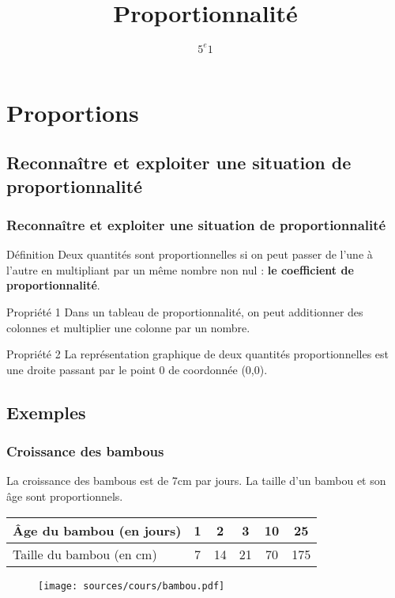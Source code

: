 \documentclass{beamer}
\title{Proportionnalité}
\author{$5^{e}1$}
\begin{document}
\frame{\titlepage}

\section{Proportions}
\subsection{Reconnaître et exploiter une situation de proportionnalité}

\begin{frame}
  \frametitle{Reconnaître et exploiter une situation de proportionnalité}
  \begin{alertblock}{Définition}	
    Deux quantités sont proportionnelles si on peut passer de l'une à l'autre en multipliant par un même nombre non nul : \textbf{le coefficient de proportionnalité}.
  \end{alertblock}

  \begin{block}{Propriété 1}
    Dans un tableau de proportionnalité, on peut additionner des colonnes et multiplier une colonne par un nombre.
  \end{block}
    
  \begin{block}{Propriété 2}
    La représentation graphique de deux quantités proportionnelles est une droite passant par le point 0 de coordonnée (0,0).
  \end{block}
\end{frame}

\subsection{Exemples}

\begin{frame}
  \frametitle{Croissance des bambous}
  \begin{block}{}	
    La croissance des bambous est de 7cm par jours. La taille d'un bambou et son âge sont proportionnels.
    
  \end{block}
  \begin{center}
    \begin{tabular}{| l || c | c | c | c | c |}
      \hline			
      Âge du bambou (en jours) & 1 &  2 &  3 & 10 &  25\\
      \hline  
      Taille du bambou (en cm) & 7 & 14 & 21 & 70 & 175\\
      \hline  
    \end{tabular}
  \end{center}

  \begin{figure}[H]
    \centering
    \texttt{[image: sources/cours/bambou.pdf]}
  \end{figure}
\end{frame}
\end{document}
